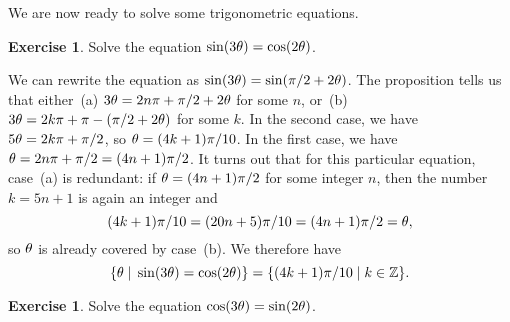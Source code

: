 \documentclass[a4paper]{book}
\theoremstyle{definition}
\newtheorem{exercise}[theorem]{Exercise}
\renewenvironment{solution}{\SolutionInline}{\endSolutionInline}
\begin{document}
We are now ready to solve some trigonometric equations.
\begin{exercise}
 Solve the equation $\sin(3\theta)=\cos(2\theta)$.
\end{exercise}
\begin{solution}
 We can rewrite the equation as $\sin(3\theta)=\sin(\pi/2+2\theta)$.  The
 proposition tells us that either~(a) $3\theta=2n\pi+\pi/2+2\theta$ for
 some $n$, or~(b) $3\theta=2k\pi+\pi-(\pi/2+2\theta)$ for some $k$.  In the
 second case, we have $5\theta=2k\pi+\pi/2$, so $\theta=(4k+1)\pi/10$.  In
 the first case, we have $\theta=2n\pi+\pi/2=(4n+1)\pi/2$.  It turns out
 that for this particular equation, case~(a) is redundant: if
 $\theta=(4n+1)\pi/2$ for some integer $n$, then the number $k=5n+1$ is
 again an integer and 
 \[ (4k+1)\pi/10=(20n+5)\pi/10=(4n+1)\pi/2=\theta, \]
 so $\theta$ is already covered by case~(b).  We therefore have
 \[ \{\theta\;|\;\sin(3\theta)=\cos(2\theta)\} = 
      \{(4k+1)\pi/10\;|\; k\in{\mathbb{Z}}\}.
 \]
\end{solution}
\begin{exercise}
 Solve the equation $\cos(3\theta)=\sin(2\theta)$.
\end{exercise}
\end{document}
